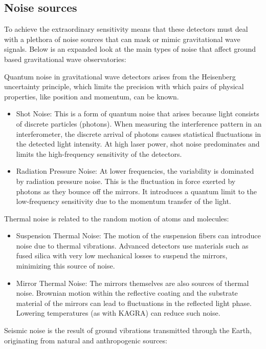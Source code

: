 \subsection{Noise sources}

To achieve the extraordinary sensitivity means that these detectors must deal with a plethora of noise sources that can mask or mimic gravitational wave signals. Below is an expanded look at the main types of noise that affect ground based gravitational wave observatories:

Quantum noise in gravitational wave detectors arises from the Heisenberg uncertainty principle, which limits the precision with which pairs of physical properties, like position and momentum, can be known.
\begin{itemize}
    \item Shot Noise: This is a form of quantum noise that arises because light consists of discrete particles (photons). When measuring the interference pattern in an interferometer, the discrete arrival of photons causes statistical fluctuations in the detected light intensity. At high laser power, shot noise predominates and limits the high-frequency sensitivity of the detectors.
    \item Radiation Pressure Noise: At lower frequencies, the variability is dominated by radiation pressure noise. This is the fluctuation in force exerted by photons as they bounce off the mirrors. It introduces a quantum limit to the low-frequency sensitivity due to the momentum transfer of the light.
\end{itemize}


Thermal noise is related to the random motion of atoms and molecules:
\begin{itemize}
    \item Suspension Thermal Noise: The motion of the suspension fibers can introduce noise due to thermal vibrations. Advanced detectors use materials such as fused silica with very low mechanical losses to suspend the mirrors, minimizing this source of noise.
    \item Mirror Thermal Noise: The mirrors themselves are also sources of thermal noise. Brownian motion within the reflective coating and the substrate material of the mirrors can lead to fluctuations in the reflected light phase. Lowering temperatures (as with KAGRA) can reduce such noise.
\end{itemize}

Seismic noise is the result of ground vibrations transmitted through the Earth, originating from natural and anthropogenic sources:

